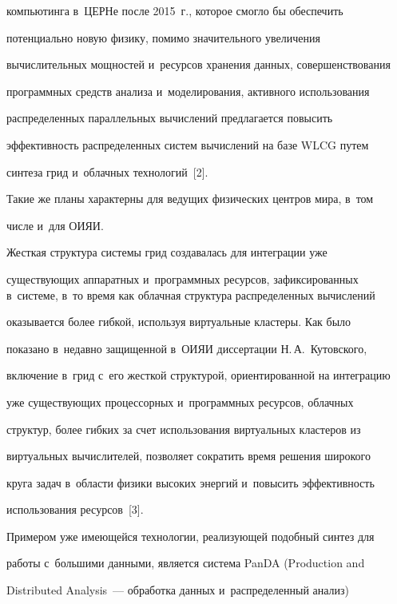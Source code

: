 компьютинга в~ЦЕРНе после 2015~г., которое смогло бы обеспечить


потенциально новую физику, помимо значительного увеличения


вычислительных мощностей и~ресурсов хранения данных, совершенствования


программных средств анализа и~моделирования, активного использования


распределенных параллельных вычислений предлагается повысить


эффективность распределенных систем вычислений на базе WLCG путем


синтеза грид и~облачных технологий~[2].





  Такие же планы характерны для ведущих физических центров мира, в~том


числе и~для ОИЯИ.





  Жесткая структура системы грид создавалась для интеграции уже


существующих аппаратных и~программных ресурсов, зафиксированных в~системе, в~то время как облачная структура распределенных вычислений


оказывается более гибкой, используя виртуальные кластеры. Как было


показано в~недавно защищенной в~ОИЯИ диссертации Н.\,А.~Кутовского,


включение в~грид с~его жесткой структурой, ориентированной на интеграцию


уже существующих процессорных и~программных ресурсов, облачных


структур, более гибких за счет использования виртуальных кластеров из


виртуальных вычислителей, позволяет сократить время решения широкого


круга задач в~области физики высоких энергий и~повысить эффективность


использования ресурсов~[3].





  Примером уже имеющейся технологии, реализующей подобный синтез для


работы с~большими данными, является система PanDA (Production and


Distributed Analysis~--- обработка данных и~распределенный анализ)


